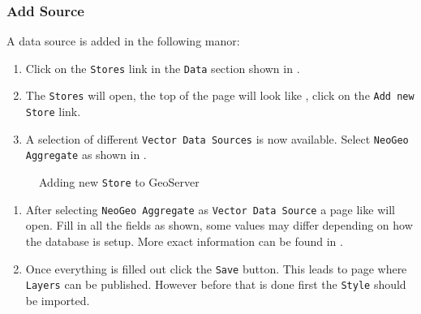 \subsubsection{Add Source}
A data source is added in the following manor:
\begin{enumerate}
	\item Click on the \lstinline|Stores| link in the \lstinline|Data| section shown in .
	\item The \lstinline|Stores| will open, the top of the page will look like , click on the \lstinline|Add new Store| link.
	\item A selection of different \lstinline|Vector Data Sources| is now available. Select \lstinline|NeoGeo Aggregate| as shown in . 
\end{enumerate}
\begin{figure}[h]
	\centering
	\caption{Adding new \lstinline|Store| to GeoServer}
\end{figure}

\begin{enumerate}[resume]
	\item After selecting \lstinline|NeoGeo Aggregate| as \lstinline|Vector Data Source| a page like  will open. Fill in all the fields as shown, some values may differ depending on how the database is setup. More exact information can be found in .
	\item Once everything is filled out click the \lstinline|Save| button. This leads to page where \lstinline|Layers| can be published. However before that is done first the \lstinline|Style| should be imported.
\end{enumerate}

